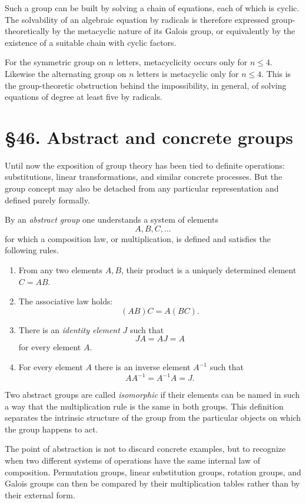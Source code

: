 \documentclass[11pt]{article}
\newcommand{\webersection}[2]{\section*{\S #1. #2}\addcontentsline{toc}{section}{\S #1. #2}}
\begin{document}
Such a group can be built by solving a chain of equations, each of which is cyclic.  The solvability of an algebraic equation by radicals is therefore expressed group-theoretically by the metacyclic nature of its Galois group, or equivalently by the existence of a suitable chain with cyclic factors.

For the symmetric group on \(n\) letters, metacyclicity occurs only for \(n\leq 4\).  Likewise the alternating group on \(n\) letters is metacyclic only for \(n\leq 4\).  This is the group-theoretic obstruction behind the impossibility, in general, of solving equations of degree at least five by radicals.

\webersection{46}{Abstract and concrete groups}

Until now the exposition of group theory has been tied to definite operations: substitutions, linear transformations, and similar concrete processes.  But the group concept may also be detached from any particular representation and defined purely formally.

By an \emph{abstract group} one understands a system of elements
\[
A,B,C,\ldots
\]
for which a composition law, or multiplication, is defined and satisfies the following rules.

\begin{enumerate}[label=\arabic*.]
\item From any two elements \(A,B\), their product is a uniquely determined element \(C=AB\).
\item The associative law holds:
\[
(AB)C=A(BC).
\]
\item There is an \emph{identity element} \(J\) such that
\[
JA=AJ=A
\]
for every element \(A\).
\item For every element \(A\) there is an inverse element \(A^{-1}\) such that
\[
AA^{-1}=A^{-1}A=J.
\]
\end{enumerate}

Two abstract groups are called \emph{isomorphic} if their elements can be named in such a way that the multiplication rule is the same in both groups.  This definition separates the intrinsic structure of the group from the particular objects on which the group happens to act.

The point of abstraction is not to discard concrete examples, but to recognize when two different systems of operations have the same internal law of composition.  Permutation groups, linear substitution groups, rotation groups, and Galois groups can then be compared by their multiplication tables rather than by their external form.
\end{document}
